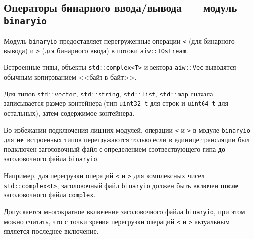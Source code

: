 \subsection{Операторы бинарного ввода/вывода~--- модуль {\tt binaryio}}
Модуль \verb'binaryio' предоставляет перегруженные операции \verb'<' (для бинарного вывода) и \verb'>' (для бинарного ввода)
в потоки \verb'aiw::IOstream'.

Встроенные типы, объекты \verb'std::complex<T>' и вектора \verb'aiw::Vec' выводятся обычным копированием <<байт-в-байт>>.

Для типов \verb'std::vector', \verb'std::string', \verb'std::list', \verb'std::map' сначала записывается размер контейнера
(тип \verb'uint32_t' для строк и \verb'uint64_t' для остальных), затем содержимое контейнера.

Во избежании подключения лишних модулей, операции \verb'<' и \verb'>' в модуле \verb'binaryio'
для {\bf не}\ встроенных типов перегружаются только если в единице трансляции был подключен
заголовочный файл с определением соотвествующего типа {\bf до} заголовочного файла \verb'binaryio'.

Например, для перегрузки операций \verb'<' и \verb'>' для комплексных чисел \verb'std::complex<T>',
заголовочный файл \verb'binaryio' должен быть включен {\bf после} заголовочного файла \verb'complex'.

Допускается многократное включение заголовочного файла \verb'binaryio', при этом можно считать, что с точки
зрения перегрузки операций \verb'<' и \verb'>' актуальным является
последнее включение.

